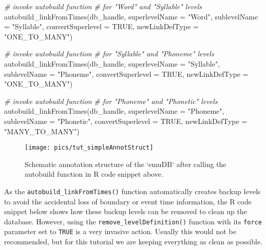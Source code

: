 \documentclass[
]{book}
\newenvironment{Shaded}{\begin{snugshade}}{\end{snugshade}}
\newcommand{\AttributeTok}[1]{\textcolor[rgb]{0.77,0.63,0.00}{#1}}
\newcommand{\CommentTok}[1]{\textcolor[rgb]{0.56,0.35,0.01}{\textit{#1}}}
\newcommand{\ConstantTok}[1]{\textcolor[rgb]{0.00,0.00,0.00}{#1}}
\newcommand{\FunctionTok}[1]{\textcolor[rgb]{0.00,0.00,0.00}{#1}}
\newcommand{\NormalTok}[1]{#1}
\newcommand{\StringTok}[1]{\textcolor[rgb]{0.31,0.60,0.02}{#1}}
\begin{document}
\begin{Shaded}
\begin{Highlighting}[]
\CommentTok{\# invoke autobuild function}
\CommentTok{\# for "Word" and "Syllable" levels}
\FunctionTok{autobuild\_linkFromTimes}\NormalTok{(db\_handle,}
                        \AttributeTok{superlevelName =} \StringTok{"Word"}\NormalTok{,}
                        \AttributeTok{sublevelName =} \StringTok{"Syllable"}\NormalTok{,}
                        \AttributeTok{convertSuperlevel =} \ConstantTok{TRUE}\NormalTok{,}
                        \AttributeTok{newLinkDefType =} \StringTok{"ONE\_TO\_MANY"}\NormalTok{)}

\CommentTok{\# invoke autobuild function}
\CommentTok{\# for "Syllable" and "Phoneme" levels}
\FunctionTok{autobuild\_linkFromTimes}\NormalTok{(db\_handle,}
                        \AttributeTok{superlevelName =} \StringTok{"Syllable"}\NormalTok{,}
                        \AttributeTok{sublevelName =} \StringTok{"Phoneme"}\NormalTok{,}
                        \AttributeTok{convertSuperlevel =} \ConstantTok{TRUE}\NormalTok{,}
                        \AttributeTok{newLinkDefType =} \StringTok{"ONE\_TO\_MANY"}\NormalTok{)}

\CommentTok{\# invoke autobuild function}
\CommentTok{\# for "Phoneme" and "Phonetic" levels}
\FunctionTok{autobuild\_linkFromTimes}\NormalTok{(db\_handle,}
                        \AttributeTok{superlevelName =} \StringTok{"Phoneme"}\NormalTok{,}
                        \AttributeTok{sublevelName =} \StringTok{"Phonetic"}\NormalTok{,}
                        \AttributeTok{convertSuperlevel =} \ConstantTok{TRUE}\NormalTok{,}
                        \AttributeTok{newLinkDefType =} \StringTok{"MANY\_TO\_MANY"}\NormalTok{)}
\end{Highlighting}
\end{Shaded}

\begin{figure}

{\centering \texttt{[image: pics/tut\_simpleAnnotStruct]} 

}

\caption{Schematic annotation structure of the `emuDB` after calling the autobuild function in R code snippet above.}\label{fig:tutorial-simpleAnnotStruct}
\end{figure}

As the \texttt{autobuild\_linkFromTimes()} function automatically creates backup levels to avoid the accidental loss of boundary or event time information, the R code snippet below shows how these backup levels can be removed to clean up the database. However, using the \texttt{remove\_levelDefinition()} function with its \texttt{force} parameter set to \texttt{TRUE} is a very invasive action. Usually this would not be recommended, but for this tutorial we are keeping everything as clean as possible.
\end{document}
